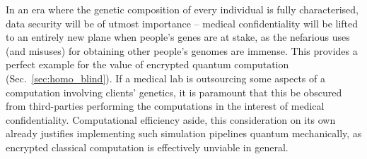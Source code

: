 In an era where the genetic composition of every individual is fully characterised, data security will be of utmost importance -- medical confidentiality will be lifted to an entirely new plane when people's genes are at stake, as the nefarious uses (and misuses) for obtaining other people's genomes are immense. This provides a perfect example for the value of encrypted quantum computation (Sec.~\ref{sec:homo_blind}). If a medical lab is outsourcing some aspects of a computation involving clients' genetics, it is paramount that this be obscured from third-parties performing the computations in the interest of medical confidentiality. Computational efficiency aside, this consideration on its own already justifies implementing such simulation pipelines quantum mechanically, as encrypted classical computation is effectively unviable in general.